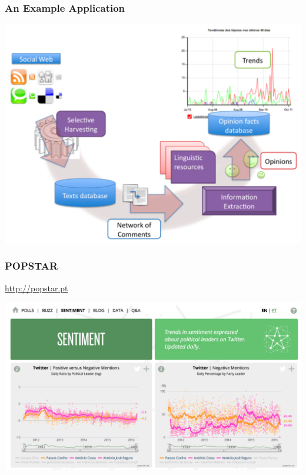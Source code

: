 \documentclass[t]{beamer}
\begin{document}
\begin{frame} \frametitle{An Example Application} 


\begin{block}{} %

\begin{center}
     \includegraphics[width=.8\textwidth]{POPSTAR-bigpic}
\end{center}

\end{block}

\end{frame} 




\begin{frame} \frametitle{POPSTAR} 


\url{http://popstar.pt}

\begin{center}
     \includegraphics[width=.9\textwidth]{POPSTAR-screenshot}
\end{center}



\end{frame} 
\end{document}
